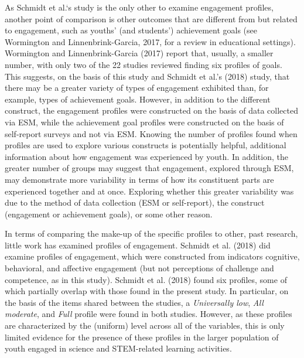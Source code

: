\documentclass[]{msu-thesis}
\theoremstyle{definition}
\theoremstyle{definition}
\theoremstyle{definition}
\theoremstyle{remark}
\begin{document}
As Schmidt et al.`s study is the only other to examine engagement
profiles, another point of comparison is other outcomes that are
different from but related to engagement, such as youths' (and
students') achievement goals (see Wormington and Linnenbrink-Garcia,
2017, for a review in educational settings). Wormington and
Linnenbrink-Garcia (2017) report that, usually, a smaller number, with
only two of the 22 studies reviewed finding six profiles of goals. This
suggests, on the basis of this study and Schmidt et al.'s (2018) study,
that there may be a greater variety of types of engagement exhibited
than, for example, types of achievement goals. However, in addition to
the different construct, the engagement profiles were constructed on the
basis of data collected via ESM, while the achievement goal profiles
were constructed on the basis of self-report surveys and not via ESM.
Knowing the number of profiles found when profiles are used to explore
various constructs is potentially helpful, additional information about
how engagement was experienced by youth. In addition, the greater number
of groups may suggest that engagement, explored through ESM, may
demonstrate more variability in terms of how its constituent parts are
experienced together and at once. Exploring whether this greater
variability was due to the method of data collection (ESM or
self-report), the construct (engagement or achievement goals), or some
other reason.

In terms of comparing the make-up of the specific profiles to other,
past research, little work has examined profiles of engagement. Schmidt
et al. (2018) did examine profiles of engagement, which were constructed
from indicators cognitive, behavioral, and affective engagement (but not
perceptions of challenge and competence, as in this study). Schmidt et
al. (2018) found six profiles, some of which partially overlap with
those found in the present study. In particular, on the basis of the
items shared between the studies, a \emph{Universally low}, \emph{All
moderate}, and \emph{Full} profile were found in both studies. However,
as these profiles are characterized by the (uniform) level across all of
the variables, this is only limited evidence for the presence of these
profiles in the larger population of youth engaged in science and
STEM-related learning activities.
\end{document}
